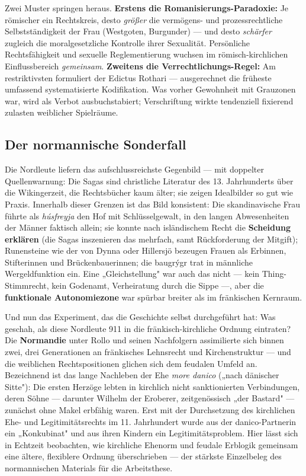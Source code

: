 \documentclass[11pt,a4paper,ngerman]{scrartcl}
\newcommand{\chipbase}[2]{\hspace{0pt}{\footnotesize\textcolor{#1}{[\textsc{#2}]}}}
\newcommand{\chipbelegt}[1]{\chipbase{chipgreen}{#1}}
\newcommand{\chipplausibel}[1]{\chipbase{chipamber}{#1}}
\newcommand{\chipumstritten}[1]{\chipbase{chipred}{#1}}
\begin{document}
Zwei Muster springen heraus. \textbf{Erstens die Romanisierungs-Paradoxie:} Je römischer ein Rechtskreis, desto \emph{größer} die vermögens- und prozessrechtliche Selbstständigkeit der Frau (Westgoten, Burgunder) — und desto \emph{schärfer} zugleich die moralgesetzliche Kontrolle ihrer Sexualität. Persönliche Rechtsfähigkeit und sexuelle Reglementierung wuchsen im römisch-kirchlichen Einflussbereich \emph{gemeinsam}. \chipplausibel{plausibel} \textbf{Zweitens die Verrechtlichungs-Regel:} Am restriktivsten formuliert der Edictus Rothari — ausgerechnet die früheste umfassend systematisierte Kodifikation. Was vorher Gewohnheit mit Grauzonen war, wird als Verbot ausbuchstabiert; Verschriftung wirkte tendenziell fixierend zulasten weiblicher Spielräume. \chipplausibel{plausibel}

\subsection*{Der normannische Sonderfall}

Die Nordleute liefern das aufschlussreichste Gegenbild — mit doppelter Quellenwarnung: Die Sagas sind christliche Literatur des 13. Jahrhunderts über die Wikingerzeit, die Rechtsbücher kaum älter; sie zeigen Idealbilder so gut wie Praxis. \chipumstritten{umstritten} Innerhalb dieser Grenzen ist das Bild konsistent: Die skandinavische Frau führte als \emph{húsfreyja} den Hof mit Schlüsselgewalt, in den langen Abwesenheiten der Männer faktisch allein; sie konnte nach isländischem Recht die \textbf{Scheidung erklären} (die Sagas inszenieren das mehrfach, samt Rückforderung der Mitgift); Runensteine wie der von Dynna oder Hillersjö bezeugen Frauen als Erbinnen, Stifterinnen und Brückenbauerinnen; die baugrýgr trat in männliche Wergeldfunktion ein. Eine „Gleichstellung" war auch das nicht — kein Thing-Stimmrecht, kein Godenamt, Verheiratung durch die Sippe —, aber die \textbf{funktionale Autonomiezone} war spürbar breiter als im fränkischen Kernraum. \chipplausibel{plausibel}

Und nun das Experiment, das die Geschichte selbst durchgeführt hat: Was geschah, als diese Nordleute 911 in die fränkisch-kirchliche Ordnung eintraten? Die \textbf{Normandie} unter Rollo und seinen Nachfolgern assimilierte sich binnen zwei, drei Generationen an fränkisches Lehnsrecht und Kirchenstruktur — und die weiblichen Rechtspositionen glichen sich dem feudalen Umfeld an. Bezeichnend ist das lange Nachleben der Ehe \emph{more danico} („nach dänischer Sitte"): Die ersten Herzöge lebten in kirchlich nicht sanktionierten Verbindungen, deren Söhne — darunter Wilhelm der Eroberer, zeitgenössisch „der Bastard" — zunächst ohne Makel erbfähig waren. Erst mit der Durchsetzung des kirchlichen Ehe- und Legitimitätsrechts im 11. Jahrhundert wurde aus der danico-Partnerin ein „Konkubinat" und aus ihren Kindern ein Legitimitätsproblem. \chipbelegt{belegt} Hier lässt sich in Echtzeit beobachten, wie kirchliche Ehenorm und feudale Erblogik gemeinsam eine ältere, flexiblere Ordnung überschrieben — der stärkste Einzelbeleg des normannischen Materials für die Arbeitsthese. \chipplausibel{plausibel}
\end{document}

